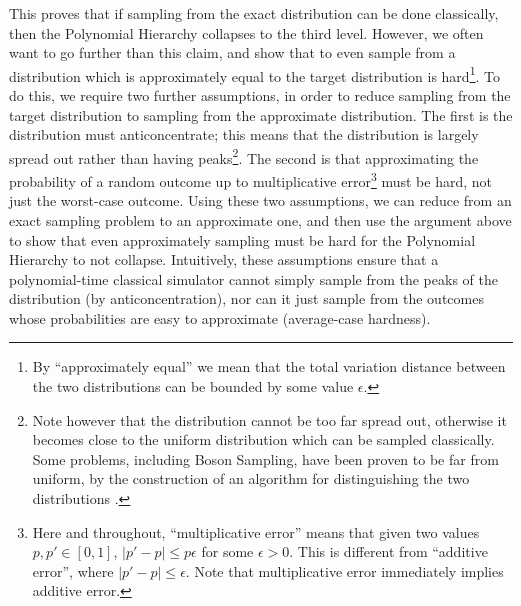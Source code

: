 This proves that if sampling from the exact distribution can be done classically, then the Polynomial Hierarchy collapses to the third level. However, we often want to go further than this claim, and show that to even sample from a distribution which is approximately equal to the target distribution is hard\footnote{By ``approximately equal'' we mean that the total variation distance between the two distributions can be bounded by some value $\epsilon$.}. To do this, we require two further assumptions, in order to reduce sampling from the target distribution to sampling from the approximate distribution. The first is the distribution must anticoncentrate; this means that the distribution is largely spread out rather than having peaks\footnote{Note however that the distribution cannot be too far spread out, otherwise it becomes close to the uniform distribution which can be sampled classically. Some problems, including Boson Sampling, have been proven to be far from uniform, by the construction of an algorithm for distinguishing the two distributions \cite{aaronson2014}.}. The second is that approximating the probability of a random outcome up to multiplicative error\footnote{Here and throughout, ``multiplicative error'' means that given two values $p, p' \in [0,1]$, $|p'-p|\leq p\epsilon$ for some $\epsilon > 0$. This is different from ``additive error'', where $|p'-p|\leq \epsilon$. Note that multiplicative error immediately implies additive error.} must be hard, not just the worst-case outcome. Using these two assumptions, we can reduce from an exact sampling problem to an approximate one, and then use the argument above to show that even approximately sampling must be hard for the Polynomial Hierarchy to not collapse. Intuitively, these assumptions ensure that a polynomial-time classical simulator cannot simply sample from the peaks of the distribution (by anticoncentration), nor can it just sample from the outcomes whose probabilities are easy to approximate (average-case hardness).

